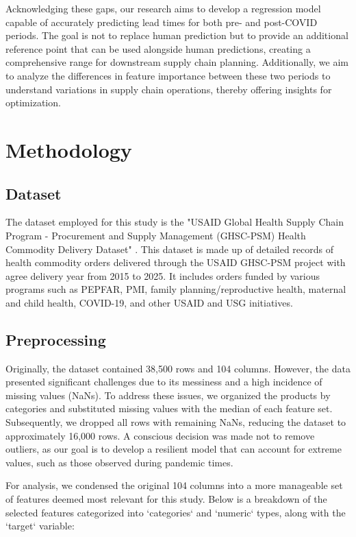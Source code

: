 \documentclass[12pt]{report}
\begin{document}
Acknowledging these gaps, our research aims to develop a regression model capable of accurately predicting lead times for both pre- and post-COVID periods. The goal is not to replace human prediction but to provide an additional reference point that can be used alongside human predictions, creating a comprehensive range for downstream supply chain planning. Additionally, we aim to analyze the differences in feature importance between these two periods to understand variations in supply chain operations, thereby offering insights for optimization.

\section{Methodology}
\label{sec:methodology}
\subsection{Dataset}
The dataset employed for this study is the "USAID Global Health Supply Chain Program - Procurement and Supply Management (GHSC-PSM) Health Commodity Delivery Dataset" \cite{dataset}. This dataset is made up of detailed records of health commodity orders delivered through the USAID GHSC-PSM project with agree delivery year from 2015 to 2025. It includes orders funded by various programs such as PEPFAR, PMI, family planning/reproductive health, maternal and child health, COVID-19, and other USAID and USG initiatives.

\subsection{Preprocessing}

Originally, the dataset contained 38,500 rows and 104 columns. However, the data presented significant challenges due to its messiness and a high incidence of missing values (NaNs). To address these issues, we organized the products by categories and substituted missing values with the median of each feature set. Subsequently, we dropped all rows with remaining NaNs, reducing the dataset to approximately 16,000 rows. A conscious decision was made not to remove outliers, as our goal is to develop a resilient model that can account for extreme values, such as those observed during pandemic times.

For analysis, we condensed the original 104 columns into a more manageable set of features deemed most relevant for this study. Below is a breakdown of the selected features categorized into `categories` and `numeric` types, along with the `target` variable:
\end{document}
